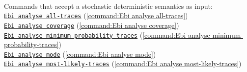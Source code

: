 {\\Commands that accept a stochastic deterministic semantics as input: \\\null\qquad\hyperref[command:Ebi analyse all-traces]{\texttt{Ebi analyse all-traces}} (\cref{command:Ebi analyse all-traces})\\\null\qquad\hyperref[command:Ebi analyse coverage]{\texttt{Ebi analyse coverage}} (\cref{command:Ebi analyse coverage})\\\null\qquad\hyperref[command:Ebi analyse minimum-probability-traces]{\texttt{Ebi analyse minimum-probability-traces}} (\cref{command:Ebi analyse minimum-probability-traces})\\\null\qquad\hyperref[command:Ebi analyse mode]{\texttt{Ebi analyse mode}} (\cref{command:Ebi analyse mode})\\\null\qquad\hyperref[command:Ebi analyse most-likely-traces]{\texttt{Ebi analyse most-likely-traces}} (\cref{command:Ebi analyse most-likely-traces})
}

